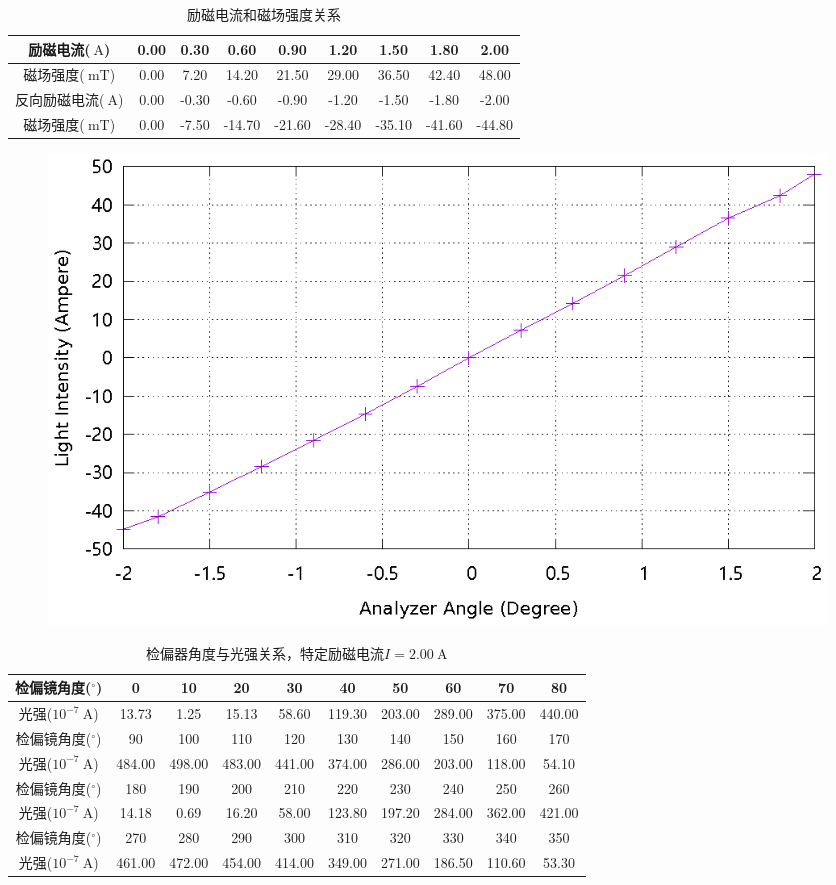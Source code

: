 \documentclass{ctexart}
\newcommand{\si}[1]{\  \mathrm{#1}}
\begin{document}
\newpage
\begin{table}[H]
    \centering
    \begin{tabular}{|c|c|c|c|c|c|c|c|c|}
        \hline
        励磁电流($\si{A}$)   & 0.00 & 0.30 & 0.60 & 0.90 & 1.20 & 1.50 & 1.80 & 2.00 \\\hline
        磁场强度($\si{mT}$)  & 0.00 & 7.20 & 14.20 & 21.50 & 29.00 & 36.50 & 42.40 & 48.00 \\\hline
        反向励磁电流($\si{A}$) & 0.00 & -0.30 & -0.60 & -0.90 & -1.20 & -1.50 & -1.80 & -2.00 \\\hline
        磁场强度($\si{mT}$)  & 0.00 & -7.50 & -14.70 & -21.60 & -28.40 & -35.10 & -41.60 & -44.80 \\\hline
    \end{tabular}
    \caption{励磁电流和磁场强度关系}
\end{table}
\begin{figure}[H]
    \centering
    \includegraphics[width=0.9\linewidth]{../output/current-mfield.gnuplot}
\end{figure}
\newpage
\begin{table}[H]
    \centering
    \begin{tabular}{|c|c|c|c|c|c|c|c|c|c|}
        \hline
        检偏镜角度(${}^{\circ}$)  & 0   & 10  & 20  & 30  & 40  & 50  & 60  & 70  & 80  \\\hline
        光强($10^{-7} \si{A}$) & 13.73 & 1.25 & 15.13 & 58.60 & 119.30 & 203.00 & 289.00 & 375.00 & 440.00 \\\hline
        检偏镜角度(${}^{\circ}$)  & 90  & 100 & 110 & 120 & 130 & 140 & 150 & 160 & 170 \\\hline
        光强($10^{-7} \si{A}$) & 484.00 & 498.00 & 483.00 & 441.00 & 374.00 & 286.00 & 203.00 & 118.00 & 54.10 \\\hline
        检偏镜角度(${}^{\circ}$)  & 180 & 190 & 200 & 210 & 220 & 230 & 240 & 250 & 260 \\\hline
        光强($10^{-7} \si{A}$) & 14.18 & 0.69 & 16.20 & 58.00 & 123.80 & 197.20 & 284.00 & 362.00 & 421.00 \\\hline
        检偏镜角度(${}^{\circ}$)  & 270 & 280 & 290 & 300 & 310 & 320 & 330 & 340 & 350 \\\hline
        光强($10^{-7} \si{A}$) & 461.00 & 472.00 & 454.00 & 414.00 & 349.00 & 271.00 & 186.50 & 110.60 & 53.30 \\\hline
    \end{tabular}
    \caption{检偏器角度与光强关系，特定励磁电流$I=2.00 \si{A}$}
\end{table}
\end{document}
